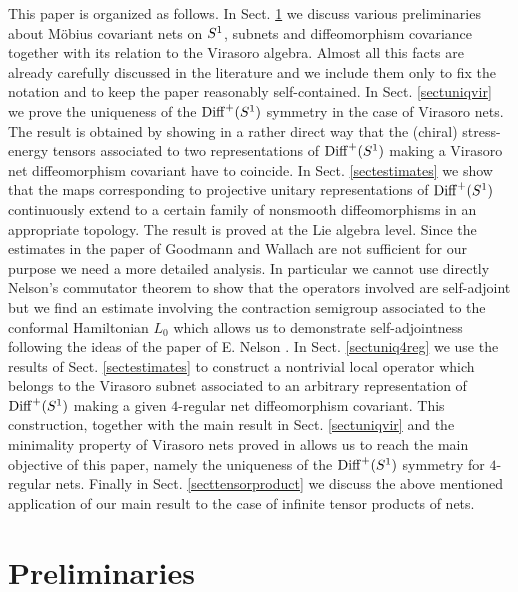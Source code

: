 \documentclass[12pt]{article}
\begin{document}
This paper is organized as follows. In Sect. \ref{sectprel} we discuss
various preliminaries about M\"obius covariant nets on $\s1$, 
subnets and diffeomorphism covariance together with its relation to the
Virasoro algebra. Almost all this facts are already carefully discussed in
the literature and we include them only to fix the notation and to keep
the paper reasonably self-contained. In Sect. \ref{sectuniqvir} we prove
the uniqueness of the ${{\rm Diff}^+(S^1)}$ symmetry in the case of Virasoro nets. The
result is obtained by showing in a rather direct way that the (chiral)
stress-energy tensors associated to two representations of ${{\rm Diff}^+(S^1)}$ making
a Virasoro net diffeomorphism covariant have to coincide.  In Sect.
\ref{sectestimates} we show that the maps corresponding to projective
unitary representations of ${{\rm Diff}^+(S^1)}$ continuously extend to a certain family
of nonsmooth diffeomorphisms in an appropriate topology. The result is 
proved at the Lie algebra level. Since the estimates in the paper
of Goodmann and Wallach \cite{GoWa} are not sufficient for our purpose we
need a more detailed analysis. In particular we cannot use directly
Nelson's commutator theorem \cite{Ne,RSII} to show that the operators
involved are self-adjoint but we find an estimate involving
the contraction semigroup associated to the conformal Hamiltonian $L_0$
which allows us to demonstrate self-adjointness following the 
ideas of the paper of E. Nelson \cite{Ne}. In Sect. \ref{sectuniq4reg} we
use the results of Sect. \ref{sectestimates} to construct a nontrivial local
operator which belongs to the Virasoro subnet associated to an arbitrary
representation of ${{\rm Diff}^+(S^1)}$ making a given $4$-regular net diffeomorphism
covariant. This construction, together with the main result in Sect.
\ref{sectuniqvir} and the minimality property of Virasoro nets proved in
\cite{Carpi98} allows us to reach the main objective of this paper, 
namely the uniqueness of the ${{\rm Diff}^+(S^1)}$ symmetry for $4$-regular nets. 
Finally in Sect. \ref{secttensorproduct} we discuss the above mentioned 
application of our main result to the case of infinite tensor products of 
nets.

\section{Preliminaries}
\label{sectprel}
\end{document}
